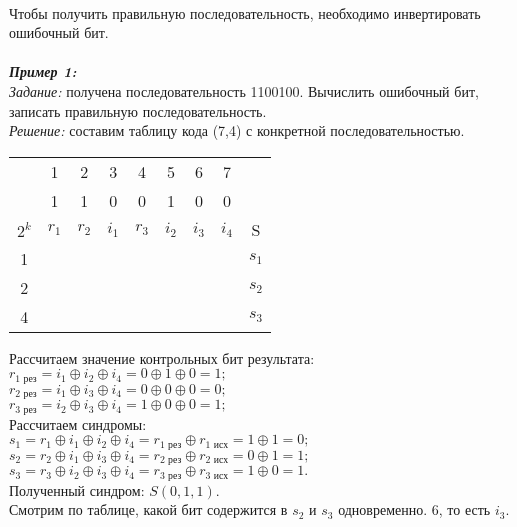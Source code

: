 \\Чтобы получить правильную последовательность, необходимо инвертировать ошибочный бит.
\\
\\\emph{\textbf{Пример 1:}}
\\\emph{Задание:} получена последовательность 1100100. Вычислить ошибочный бит, записать правильную последовательность.
\\\emph{Решение:} составим таблицу кода (7,4) с конкретной последовательностью.
\begin{table}[h]
\begin{tabular}{|c|c|c|c|c|c|c|c|c|}
\hline
& 1 & 2 & 3 & 4 & 5 & 6 & 7 & \\
\rowcolor{Gray1}
\hline
& 1 & 1 & 0 & 0 & 1 & 0 & 0 & \\
\hline
$2^k$ & $r_{1}$ & $r_{2}$ & $i_{1}$ & $r_{3}$ & $i_{2}$ & $i_{3}$ & $i_{4}$ & S\\
\hline
1 & \cellcolor{Gray1}{X} & & \cellcolor{Gray1}{X} & & \cellcolor{Gray1}{X} & & \cellcolor{Gray1}{X} & $s_{1}$\\
\hline
2 & & \cellcolor{Gray2}{X} & \cellcolor{Gray2}{X} & & & \cellcolor{Gray2}{X} & \cellcolor{Gray2}{X} & $s_{2}$ \\
\hline
4 & & & & \cellcolor{Gray3}{X} & \cellcolor{Gray3}{X} & \cellcolor{Gray3}{X} & \cellcolor{Gray3}{X} & $s_{3}$ \\
\hline
\end{tabular}
\end{table}
Рассчитаем значение контрольных бит результата:
\\$r_{1\mbox{ рез}} = i_1 \oplus i_2 \oplus i_4 = 0 \oplus 1 \oplus 0 = 1;$
\\$r_{2\mbox{ рез}} = i_1 \oplus i_3 \oplus i_4 = 0 \oplus 0 \oplus 0 = 0;$
\\$r_{3\mbox{ рез}} = i_2 \oplus i_3 \oplus i_4 = 1 \oplus 0 \oplus 0 = 1;$
\\Рассчитаем синдромы:
\\$s_1 = r_1 \oplus i_1 \oplus i_2 \oplus i_4 = r_{1\mbox{ рез}} \oplus r_{1\mbox{ исх}} = 1 \oplus 1 = 0;$
\\$s_2 = r_2 \oplus i_1 \oplus i_3 \oplus i_4 = r_{2\mbox{ рез}} \oplus r_{2\mbox{ исх}} = 0 \oplus 1 = 1;$
\\$s_3 = r_3 \oplus i_2 \oplus i_3 \oplus i_4 = r_{3\mbox{ рез}} \oplus r_{3\mbox{ исх}} = 1 \oplus 0 = 1.$
\\Полученный синдром: $S(0,1,1)$.
\\Смотрим по таблице, какой бит содержится в $s_2$ и $s_3$ одновременно. 6, то есть $i_3$.
